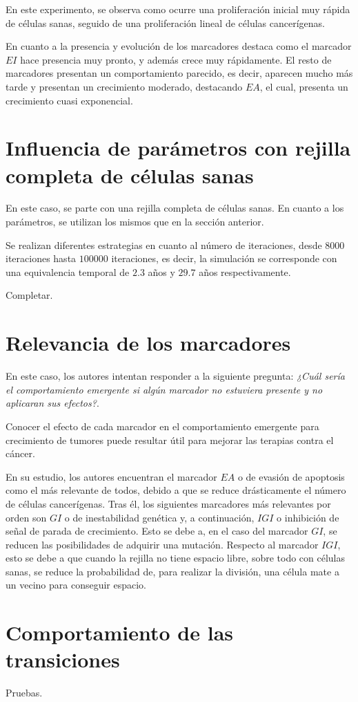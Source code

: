En este experimento, se observa como ocurre una proliferación inicial muy rápida
de células sanas, seguido de una proliferación lineal de células cancerígenas.

En cuanto a la presencia y evolución de los marcadores destaca como el marcador $EI$ hace
presencia muy pronto, y además crece muy rápidamente. El resto de marcadores presentan un
comportamiento parecido, es decir, aparecen mucho más tarde y presentan un crecimiento moderado,
destacando $EA$, el cual, presenta un crecimiento cuasi exponencial.

\section{Influencia de parámetros con rejilla completa de células sanas}

En este caso, se parte con una rejilla completa de células sanas. En cuanto a los parámetros,
se utilizan los mismos que en la sección anterior.

Se realizan diferentes estrategias en cuanto al número de iteraciones, desde $8000$ iteraciones
hasta $100000$ iteraciones, es decir, la simulación se corresponde con una equivalencia temporal
de $2.3$ años y $29.7$ años respectivamente.

Completar.

\section{Relevancia de los marcadores}

En este caso, los autores intentan responder a la siguiente pregunta: \textit{¿Cuál sería
el comportamiento emergente si algún marcador no estuviera presente y no aplicaran
sus efectos?}.

Conocer el efecto de cada marcador en el comportamiento emergente para crecimiento de tumores
puede resultar útil para mejorar las terapias contra el cáncer.

En su estudio, los autores encuentran el marcador $EA$ o de evasión de apoptosis como el más
relevante de todos, debido a que se reduce drásticamente el número de células cancerígenas.
Tras él, los siguientes marcadores más relevantes por orden son $GI$ o de inestabilidad genética y,
a continuación, $IGI$ o inhibición de señal de parada de crecimiento. Esto se debe a, en el caso
del marcador $GI$, se reducen las posibilidades de adquirir una mutación. Respecto al marcador $IGI$,
esto se debe a que cuando la rejilla no tiene espacio libre, sobre todo con células sanas, se reduce
la probabilidad de, para realizar la división, una célula mate a un vecino para conseguir espacio.

\section{Comportamiento de las transiciones}

Pruebas.
